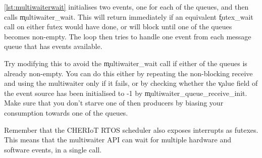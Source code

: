 \ref{lst:multiwaiterwait} initialises two events, one for each of the queues, and then calls \c{multiwaiter_wait}.
This will return immediately if an equivalent \c{futex_wait} call on either futex would have done, or will block until one of the queues becomes non-empty.
The loop then tries to handle one event from each message queue that has events available.

\codelisting[filename=examples/multiwaiter/queue.cc,marker=multiwaiter_use,label=lst:multiwaiterwait,caption="Using a multiwaiter to wait for either of two queues."]{}

Try modifying this to avoid the \c{multiwaiter_wait} call if either of the queues is already non-empty.
You can do this either by repeating the non-blocking receive and using the multiwaiter only if it fails, or by checking whether the \c{value} field of the event source has been initialised to -1 by \c{multiwaiter_queue_receive_init}.
Make sure that you don't starve one of then producers by biasing your consumption towards one of the queues.

Remember that the CHERIoT RTOS scheduler also exposes interrupts as futexes.
This means that the multiwaiter API can wait for multiple hardware and software events, in a single call.
